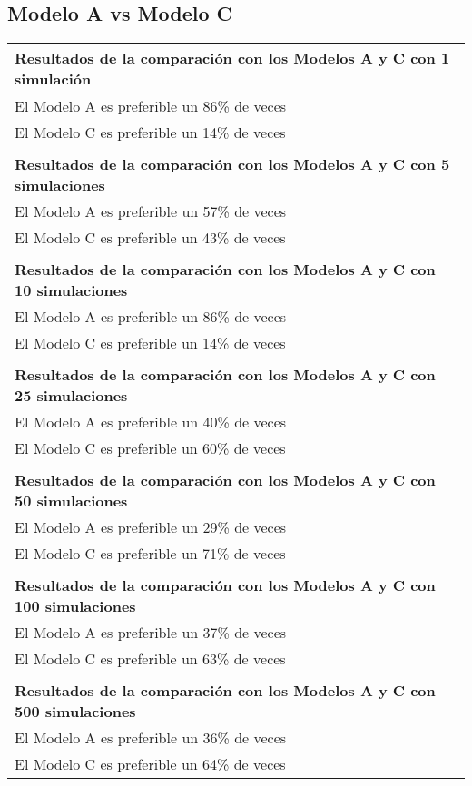 \subsection{Modelo A vs Modelo C}
\begin{table}[H]
\centering
\begin{tabular}{|l|}
\hline
\textbf{Resultados de la comparación con los Modelos A  y C con 1 simulación} \\ \hline
El Modelo A es preferible un 86\% de veces \\ \hline
El Modelo C es preferible un 14\% de veces \\ \hline
 \\ \hline
\textbf{Resultados de la comparación con los Modelos A  y C con 5 simulaciones} \\ \hline
El Modelo A es preferible un 57\% de veces \\ \hline
El Modelo C es preferible un 43\% de veces \\ \hline
 \\ \hline
\textbf{Resultados de la comparación con los Modelos A  y C con 10 simulaciones} \\ \hline
El Modelo A es preferible un 86\% de veces \\ \hline
El Modelo C es preferible un 14\% de veces \\ \hline
 \\ \hline
\textbf{Resultados de la comparación con los Modelos A  y C con 25 simulaciones} \\ \hline
El Modelo A es preferible un 40\% de veces \\ \hline
El Modelo C es preferible un 60\% de veces \\ \hline
 \\ \hline
\textbf{Resultados de la comparación con los Modelos A  y C con 50 simulaciones} \\ \hline
El Modelo A es preferible un 29\% de veces \\ \hline
El Modelo C es preferible un 71\% de veces \\ \hline
 \\ \hline
\textbf{Resultados de la comparación con los Modelos A  y C con 100 simulaciones} \\ \hline
El Modelo A es preferible un 37\% de veces \\ \hline
El Modelo C es preferible un 63\% de veces \\ \hline
 \\ \hline
\textbf{Resultados de la comparación con los Modelos A  y C con 500 simulaciones} \\ \hline
El Modelo A es preferible un 36\% de veces \\ \hline
El Modelo C es preferible un 64\% de veces \\ \hline
\end{tabular}
\end{table}


